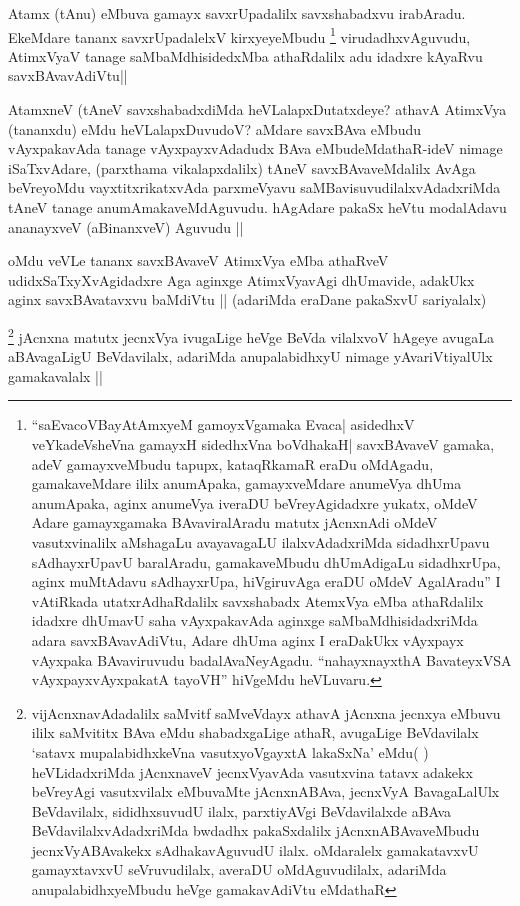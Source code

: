 \begin{artha}
Atamx (tAnu) eMbuva gamayx savxrUpadalilx savxshabadxvu irabAradu. EkeMdare tananx savxrUpadalelxV kirxyeyeMbudu \footnote[1]{``saEvacoVBayAtAmx\s yeM gamoyxVgamaka Evaca| asidedhxV veYkadeVsheVna gamayxH sidedhxVna boVdhakaH| savxBAvaveV gamaka, adeV gamayxveMbudu tapupx, kataqRkamaR eraDu oMdAgadu, gamakaveMdare ililx anumApaka, gamayxveMdare anumeVya dhUma anumApaka, aginx anumeVya iveraDU beVreyAgidadxre yukatx, oMdeV Adare gamayxgamaka BAvaviralAradu matutx jAcnxnAdi oMdeV vasutxvinalilx aMshagaLu avayavagaLU ilalxvAdadxriMda sidadhxrUpavu sAdhayxrUpavU baralAradu, gamakaveMbudu dhUmAdigaLu sidadhxrUpa, aginx muMtAdavu sAdhayxrUpa, hiVgiruvAga eraDU oMdeV AgalAradu'' I vAtiRkada utatxrAdhaRdalilx savxshabadx AtemxVya eMba athaRdalilx idadxre dhUmavU saha vAyxpakavAda aginxge saMbaMdhisidadxriMda adara savxBAvavAdiVtu, Adare dhUma aginx I eraDakUkx vAyxpayx vAyxpaka BAvaviruvudu badalAvaNeyAgadu. ``nahayxnayxthA BavateyxVSA vAyxpayxvAyxpakatA tayoVH'' hiVgeMdu heVLuvaru.} virudadhxvAguvudu, AtimxVyaV tanage saMbaMdhisidedxMba athaRdalilx adu idadxre kAyaRvu savxBAvavAdiVtu||
\end{artha}


\begin{artha}
AtamxneV (tAneV savxshabadxdiMda heVLalapxDutatxdeye? athavA AtimxVya (tananxdu) eMdu heVLalapxDuvudoV? aMdare savxBAva eMbudu vAyxpakavAda tanage vAyxpayxvAdadudx BAva eMbudeMdathaR-ideV nimage iSaTxvAdare, (parxthama vikalapxdalilx) tAneV savxBAvaveMdalilx AvAga beVreyoMdu vayxtitxrikatxvAda parxmeVyavu saMBavisuvudilalxvAdadxriMda tAneV tanage anumAmakaveMdAguvudu. hAgAdare pakaSx heVtu modalAdavu ananayxveV (aBinanxveV) Aguvudu ||
\end{artha}

\begin{artha}
oMdu veVLe tananx savxBAvaveV AtimxVya eMba athaRveV udidxSaTxyXvAgidadxre Aga aginxge AtimxVyavAgi dhUmavide, adakUkx aginx savxBAvatavxvu baMdiVtu ||
(adariMda eraDane pakaSxvU sariyalalx)
\end{artha}


\begin{artha}
\footnote[1]{vijAcnxnavAdadalilx saMvitf saMveVdayx athavA jAcnxna jecnxya eMbuvu ililx saMvititx BAva eMdu shabadxgaLige athaR, avugaLige BeVdavilalx `satavx mupalabidhxkeVna vasutxyoVgayxtA lakaSxNa' eMdu( ) heVLidadxriMda jAcnxnaveV jecnxVyavAda vasutxvina tatavx adakekx beVreyAgi vasutxvilalx eMbuvaMte jAcnxnABAva, jecnxVyA BavagaLalUlx BeVdavilalx, sididhxsuvudU ilalx, parxtiyAVgi BeVdavilalxde aBAva BeVdavilalxvAdadxriMda bwdadhx pakaSxdalilx jAcnxnABAvaveMbudu jecnxVyABAvakekx sAdhakavAguvudU ilalx. oMdaralelx gamakatavxvU gamayxtavxvU seVruvudilalx, averaDU oMdAguvudilalx, adariMda anupalabidhxyeMbudu heVge gamakavAdiVtu eMdathaR}
jAcnxna matutx jecnxVya ivugaLige heVge BeVda vilalxvoV hAgeye avugaLa aBAvagaLigU BeVdavilalx, adariMda anupalabidhxyU nimage yAvariVtiyalUlx gamakavalalx ||
\end{artha}

